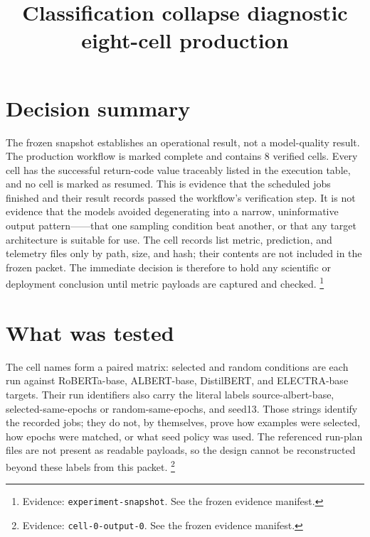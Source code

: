 \documentclass[10pt,twocolumn,letterpaper]{article}
\title{Classification collapse diagnostic eight-cell production}
\begin{document}
\maketitle
\section{Decision summary}
The frozen snapshot establishes an operational result, not a model-quality result. The production workflow is marked complete and contains 8 verified cells. Every cell has the successful return-code value traceably listed in the execution table, and no cell is marked as resumed. This is evidence that the scheduled jobs finished and their result records passed the workflow's verification step. It is not evidence that the models avoided degenerating into a narrow, uninformative output pattern——that one sampling condition beat another, or that any target architecture is suitable for use. The cell records list metric, prediction, and telemetry files only by path, size, and hash; their contents are not included in the frozen packet. The immediate decision is therefore to hold any scientific or deployment conclusion until metric payloads are captured and checked. \footnote{Evidence: \texttt{experiment-snapshot}. See the frozen evidence manifest.}

\section{What was tested}
The cell names form a paired matrix: selected and random conditions are each run against RoBERTa-base, ALBERT-base, DistilBERT, and ELECTRA-base targets. Their run identifiers also carry the literal labels source-albert-base, selected-same-epochs or random-same-epochs, and seed13. Those strings identify the recorded jobs; they do not, by themselves, prove how examples were selected, how epochs were matched, or what seed policy was used. The referenced run-plan files are not present as readable payloads, so the design cannot be reconstructed beyond these labels from this packet. \footnote{Evidence: \texttt{cell-0-output-0}. See the frozen evidence manifest.}
\end{document}
